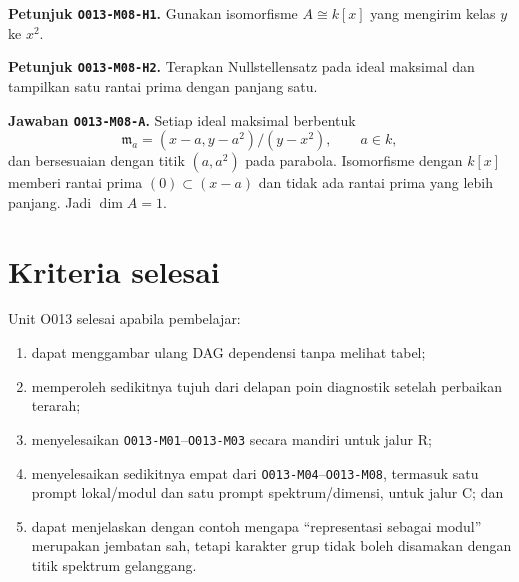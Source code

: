 \documentclass[11pt,a4paper]{article}
\newcommand{\oid}[1]{\texttt{#1}}
\begin{document}
\textbf{Petunjuk \oid{O013-M08-H1}.} Gunakan isomorfisme $A\cong k[x]$ yang
mengirim kelas $y$ ke $x^2$.

\textbf{Petunjuk \oid{O013-M08-H2}.} Terapkan Nullstellensatz pada ideal
maksimal dan tampilkan satu rantai prima dengan panjang satu.

\textbf{Jawaban \oid{O013-M08-A}.} Setiap ideal maksimal berbentuk
\[
\mathfrak m_a=(x-a,y-a^2)/(y-x^2),\qquad a\in k,
\]
dan bersesuaian dengan titik $(a,a^2)$ pada parabola. Isomorfisme dengan
$k[x]$ memberi rantai prima $(0)\subset(x-a)$ dan tidak ada rantai prima yang
lebih panjang. Jadi $\dim A=1$.

\section{Kriteria selesai}

Unit O013 selesai apabila pembelajar:

\begin{enumerate}
\item dapat menggambar ulang DAG dependensi tanpa melihat tabel;
\item memperoleh sedikitnya tujuh dari delapan poin diagnostik setelah
perbaikan terarah;
\item menyelesaikan \oid{O013-M01}--\oid{O013-M03} secara mandiri untuk
jalur R;
\item menyelesaikan sedikitnya empat dari \oid{O013-M04}\allowbreak--\allowbreak\oid{O013-M08},
termasuk satu prompt lokal/modul dan satu prompt spektrum/dimensi, untuk jalur C;
dan
\item dapat menjelaskan dengan contoh mengapa ``representasi sebagai modul''
merupakan jembatan sah, tetapi karakter grup tidak boleh disamakan dengan
titik spektrum gelanggang.
\end{enumerate}
\end{document}
